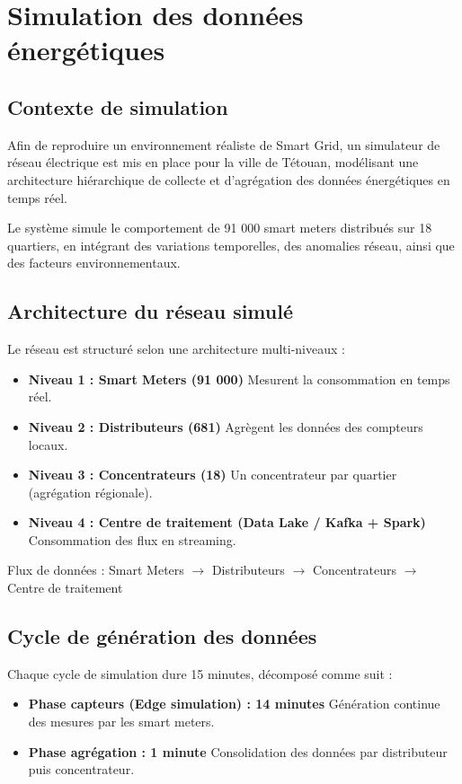 \documentclass[1pt,a4paper]{report}
\begin{document}
\section{Simulation des données énergétiques}

\subsection{Contexte de simulation}
Afin de reproduire un environnement réaliste de Smart Grid, un simulateur de réseau électrique est mis en place pour la ville de Tétouan, modélisant une architecture hiérarchique de collecte et d’agrégation des données énergétiques en temps réel.

Le système simule le comportement de 91 000 smart meters distribués sur 18 quartiers, en intégrant des variations temporelles, des anomalies réseau, ainsi que des facteurs environnementaux.

\subsection{Architecture du réseau simulé}
Le réseau est structuré selon une architecture multi-niveaux :

\begin{itemize}
\item \textbf{Niveau 1 : Smart Meters (91 000)}  
Mesurent la consommation en temps réel.

\item \textbf{Niveau 2 : Distributeurs (681)}  
Agrègent les données des compteurs locaux.

\item \textbf{Niveau 3 : Concentrateurs (18)}  
Un concentrateur par quartier (agrégation régionale).

\item \textbf{Niveau 4 : Centre de traitement (Data Lake / Kafka + Spark)}  
Consommation des flux en streaming.
\end{itemize}

Flux de données :  
Smart Meters $\rightarrow$ Distributeurs $\rightarrow$ Concentrateurs $\rightarrow$ Centre de traitement

\subsection{Cycle de génération des données}
Chaque cycle de simulation dure 15 minutes, décomposé comme suit :

\begin{itemize}
\item \textbf{Phase capteurs (Edge simulation) : 14 minutes}  
Génération continue des mesures par les smart meters.

\item \textbf{Phase agrégation : 1 minute}  
Consolidation des données par distributeur puis concentrateur.
\end{itemize}
\end{document}
